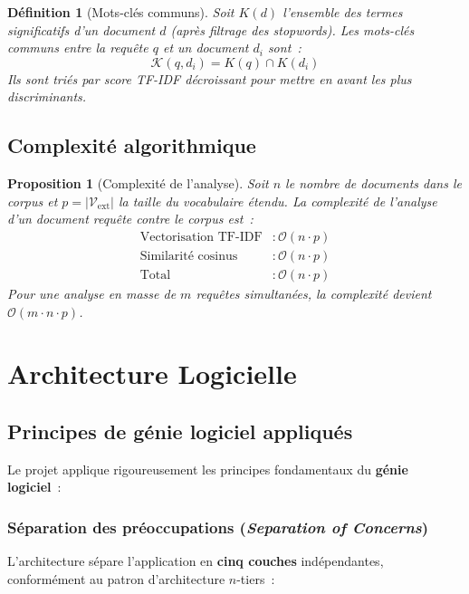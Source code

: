 \documentclass[12pt, a4paper]{article}
\newtheorem{definition}{Définition}[section]
\newtheorem{proposition}{Proposition}[section]
\begin{document}
\begin{definition}[Mots-clés communs]
Soit $K(d)$ l'ensemble des termes significatifs d'un document $d$ (après filtrage des \textit{stopwords}). Les mots-clés communs entre la requête $q$ et un document $d_i$ sont~:
\[
\mathcal{K}(q, d_i) = K(q) \cap K(d_i)
\]
Ils sont triés par score TF-IDF décroissant pour mettre en avant les plus discriminants.
\end{definition}

\subsection{Complexité algorithmique}

\begin{proposition}[Complexité de l'analyse]
Soit $n$ le nombre de documents dans le corpus et $p = |\mathcal{V}_{\text{ext}}|$ la taille du vocabulaire étendu. La complexité de l'analyse d'un document requête contre le corpus est~:
\begin{align*}
\text{Vectorisation TF-IDF} &: \mathcal{O}(n \cdot p) \\
\text{Similarité cosinus}    &: \mathcal{O}(n \cdot p) \\
\text{Total}                 &: \mathcal{O}(n \cdot p)
\end{align*}
Pour une analyse en masse de $m$ requêtes simultanées, la complexité devient $\mathcal{O}(m \cdot n \cdot p)$.
\end{proposition}

\section{Architecture Logicielle}

\subsection{Principes de génie logiciel appliqués}

Le projet applique rigoureusement les principes fondamentaux du \textbf{génie logiciel}~:

\subsubsection{Séparation des préoccupations (\textit{Separation of Concerns})}

L'architecture sépare l'application en \textbf{cinq couches} indépendantes, conformément au patron d'architecture $n$-tiers~:
\end{document}

